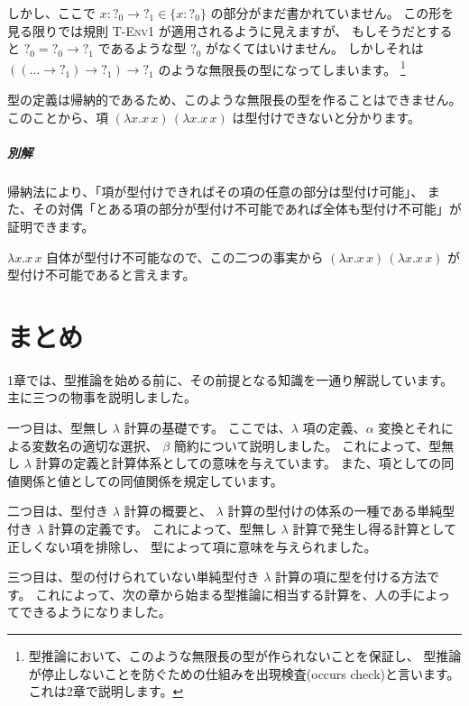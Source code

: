 \begin{exercise}
しかし、ここで $x : ?_0 \to ?_1 \in \{x : ?_0\}$ の部分がまだ書かれていません。
この形を見る限りでは規則 \textsc{T-Env1} が適用されるように見えますが、
もしそうだとすると $?_0 = ?_0 \to ?_1$ であるような型 $?_0$ がなくてはいけません。
しかしそれは $((\dots \to ?_1) \to ?_1) \to ?_1$ のような無限長の型になってしまいます。
\footnote{型推論において、このような無限長の型が作られないことを保証し、
型推論が停止しないことを防ぐための仕組みを出現検査(occurs check)と言います。
これは2章で説明します。}

型の定義は帰納的であるため、このような無限長の型を作ることはできません。
このことから、項 $(\lambda x . x \, x) \, (\lambda x . x \, x)$ は型付けできないと分かります。

\subparagraph{別解}

帰納法により、「項が型付けできればその項の任意の部分は型付け可能」、
また、その対偶「とある項の部分が型付け不可能であれば全体も型付け不可能」が証明できます。

$\lambda x . x \, x$ 自体が型付け不可能なので、この二つの事実から
$(\lambda x . x \, x) \, (\lambda x . x \, x)$ が型付け不可能であると言えます。

\end{exercise}




\section{まとめ}

1章では、型推論を始める前に、その前提となる知識を一通り解説しています。主に三つの物事を説明しました。

一つ目は、型無し $\lambda$ 計算の基礎です。
ここでは、$\lambda$ 項の定義、$\alpha$ 変換とそれによる変数名の適切な選択、
$\beta$ 簡約について説明しました。
これによって、型無し $\lambda$ 計算の定義と計算体系としての意味を与えています。
また、項としての同値関係と値としての同値関係を規定しています。

二つ目は、型付き $\lambda$ 計算の概要と、
$\lambda$ 計算の型付けの体系の一種である単純型付き $\lambda$ 計算の定義です。
これによって、型無し $\lambda$ 計算で発生し得る計算として正しくない項を排除し、
型によって項に意味を与えられました。

三つ目は、型の付けられていない単純型付き $\lambda$ 計算の項に型を付ける方法です。
これによって、次の章から始まる型推論に相当する計算を、人の手によってできるようになりました。

